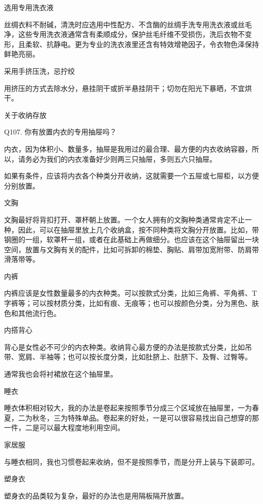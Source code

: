 \documentclass[12pt,UTF8]{ctexbook}
\begin{document}
选用专用洗衣液

丝绸衣料不耐碱，清洗时应选用中性配方、不含酶的丝绸手洗专用洗衣液或丝毛净，这些专用洗衣液通常含有柔顺成分，保护丝毛纤维不受损伤，洗后衣物不变形，且柔软、抗静电。更为专业的洗衣液里还含有特效增艳因子，令衣物色泽保持鲜艳亮丽。

采用手挤压洗，忌拧绞

用挤压的方式去除水分，悬挂阴干或折半悬挂阴干；切勿在阳光下暴晒，不宜烘干。





关于收纳存放


Q107. 你有放置内衣的专用抽屉吗？


内衣，因为体积小、数量多，抽屉是我用过的最合理、最方便的内衣收纳容器，所以，请务必为我们的内衣准备好少则两三只抽屉，多则五六只抽屉。

如果有条件，应该将内衣各个种类分开收纳，这就需要一个五屉或七屉柜，以方便分别放置。

文胸

文胸最好将背扣打开、罩杯朝上放置。一个女人拥有的文胸种类通常肯定不止一种，因此，可以在抽屉里放上几个收纳盒，按不同种类将文胸分开放置。比如，带钢圈的一组，软罩杯一组，或者在此基础上再做细分。也应该在这个抽屉留出一块空间，放置与文胸有关的配件，比如可拆卸的棉垫、胸贴、肩带加宽附带、防肩带滑落带等。

内裤

内裤应该是女性数量最多的内衣种类。可以按款式分类，比如三角裤、平角裤、T字裤等；可以按材质分类，比如有痕、无痕等；也可以按颜色分类，分为黑色、肤色和其他流行色。

内搭背心

背心是女性必不可少的内衣种类。收纳背心最方便的办法是按款式分类，比如吊带、宽肩、半袖等；也可以按长度分类，比如肚脐上、肚脐下、及臀、过臀等。

通常我也会将衬裙放在这个抽屉里。

睡衣

睡衣体积相对较大，我的办法是卷起来按照季节分成三个区域放在抽屉里，一为春夏，二为秋冬，三为特殊单品。卷起来的好处，一是可以很容易找出自己想穿的那一件，二是可以最大程度地利用空间。



家居服

与睡衣相同，我也习惯卷起来收纳，但不是按照季节，而是分开上装与下装即可。

塑身衣

塑身衣的品类较为复杂，最好的办法也是用隔板隔开放置。
\end{document}
